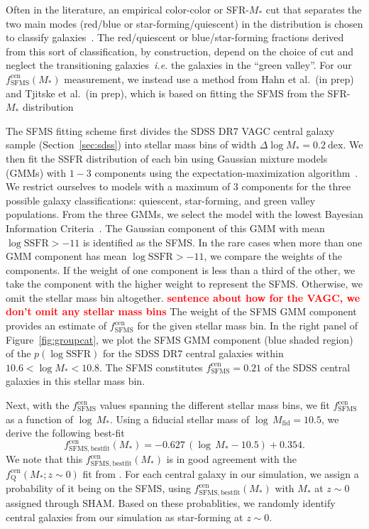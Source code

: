 \documentclass[12pt, letterpaper, preprint]{aastex}
\newcommand{\todo}[1]{{\bf \textcolor{red}{#1}}}
\newcommand{\beq}{\begin{equation}}
\newcommand{\eeq}{\end{equation}}
\begin{document}
Often in the literature, an empirical color-color or SFR-$M_*$ cut 
that separates the two main modes (red/blue or star-forming/quiescent) 
in the distribution is chosen to classify 
galaxies~\citep[\emph{e.g.}][]{baldry2006, blanton2009, drory2009, peng2010, moustakas2013, hahn2015}.
The red/quiescent or blue/star-forming fractions derived from this sort of 
classification, by construction, depend on the choice of cut and neglect the 
transitioning galaxies~\emph{i.e.} the galaxies in the ``green valley''. 
For our $f^\mathrm{cen}_\mathrm{SFMS}(M_*)$ measurement, we instead use a
method from Hahn et al.~(in prep) and Tjitske et al.~(in prep), which is 
based on fitting the SFMS from the SFR-$M_*$ distribution 

The SFMS fitting scheme first divides the SDSS DR7 VAGC central 
galaxy sample (Section~\ref{sec:sdss}) into stellar mass bins of 
width $\Delta \log M_* = 0.2~\mathrm{dex}$. We then fit the SSFR 
distribution of each bin using Gaussian mixture models (GMMs) with 
$1 - 3$ components using the expectation-maximization 
algorithm~\citep[EM;][]{dempster1977, neal1998}. We restrict 
ourselves to models with a maximum of $3$ components for the three 
possible galaxy classifications: quiescent, star-forming, and green 
valley populations. From the three GMMs, we select the model with 
the lowest Bayesian Information Criteria~\citep[BIC;][]{schwarz1978}. 
The Gaussian component of this GMM with mean $\log \mathrm{SSFR} > -11$ 
is identified as the SFMS. In the rare cases when more than one GMM 
component has mean $\log \mathrm{SSFR} > -11$, we compare the weights 
of the components.  If the weight of one component is less than a 
third of the other, we take the component with the higher weight to 
represent the SFMS. Otherwise, we omit the stellar mass bin altogether. 
\todo{sentence about how for the VAGC, we don't omit any stellar mass bins} 
The weight of the SFMS GMM component provides an estimate of 
$f^\mathrm{cen}_\mathrm{SFMS}$ for the given stellar mass bin. 
In the right panel of Figure~\ref{fig:groupcat}, we plot the SFMS 
GMM component (blue shaded region) of the $p(\log \mathrm{SSFR})$ 
for the SDSS DR7 central galaxies within $10.6 < \log M_* < 10.8$. 
The SFMS constitutes $f^\mathrm{cen}_\mathrm{SFMS} = 0.21$ of the 
SDSS central galaxies in this stellar mass bin. 

Next, with the $f^\mathrm{cen}_\mathrm{SFMS}$ values spanning 
the different stellar mass bins, we fit $f^\mathrm{cen}_\mathrm{SFMS}$ as 
a function of $\log\,M_*$. Using a fiducial stellar mass of 
$\log\,M_\mathrm{fid} = 10.5$, we derive the following best-fit 
\beq \label{eq:f_cen_sfms}
f^\mathrm{cen}_\mathrm{SFMS, bestfit}(M_*) = -0.627\,(\log\,M_* - 10.5) + 0.354. 
\eeq
We note that this $f^\mathrm{cen}_\mathrm{SFMS, bestfit}(M_*)$ is 
in good agreement with the $f_\mathrm{Q}^\mathrm{cen}(M_*; z\sim0)$ 
fit from \cite{hahn2017a}. For each central galaxy in our simulation, 
we assign a probability of it being on the SFMS, using 
$f^\mathrm{cen}_\mathrm{SFMS, bestfit}(M_*)$ with $M_*$ at $z \sim 0$ 
assigned through SHAM. Based on these probablities, we randomly 
identify central galaxies from our simulation as star-forming at 
$z \sim 0$.
\end{document}
